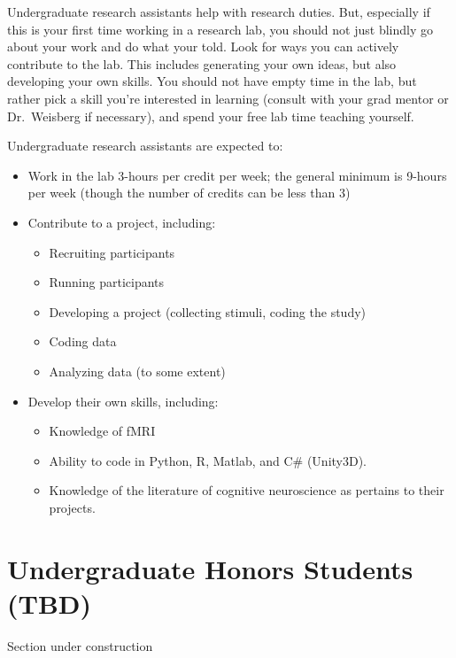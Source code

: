 \documentclass[
  12pt,
]{book}
\begin{document}
Undergraduate research assistants help with research duties. But, especially if this is your first time working in a research lab, you should not just blindly go about your work and do what your told. Look for ways you can actively contribute to the lab. This includes generating your own ideas, but also developing your own skills. You should not have empty time in the lab, but rather pick a skill you're interested in learning (consult with your grad mentor or Dr.~Weisberg if necessary), and spend your free lab time teaching yourself.

Undergraduate research assistants are expected to:

\begin{itemize}
\item
  Work in the lab 3-hours per credit per week; the general minimum is 9-hours per week (though the number of credits can be less than 3)
\item
  Contribute to a project, including:

  \begin{itemize}
  \item
    Recruiting participants
  \item
    Running participants
  \item
    Developing a project (collecting stimuli, coding the study)
  \item
    Coding data
  \item
    Analyzing data (to some extent)
  \end{itemize}
\item
  Develop their own skills, including:

  \begin{itemize}
  \item
    Knowledge of fMRI
  \item
    Ability to code in Python, R, Matlab, and C\# (Unity3D).
  \item
    Knowledge of the literature of cognitive neuroscience as pertains to their projects.
  \end{itemize}
\end{itemize}

\hypertarget{undergraduate-honors-students-tbd}{%
\section{Undergraduate Honors Students (TBD)}\label{undergraduate-honors-students-tbd}}

Section under construction
\end{document}
